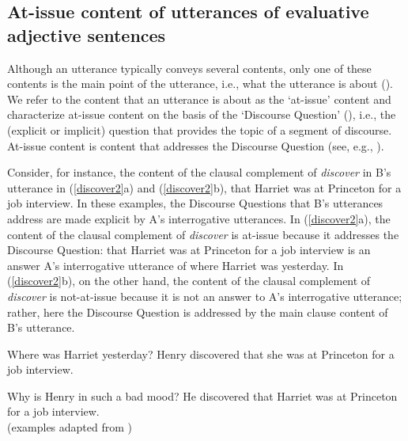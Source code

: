 \documentclass[11pt,fleqn]{article}
\newcommand{\6}{\mbox{$[\hspace*{-.6mm}[$}}
\newcommand{\9}{\mbox{$]\hspace*{-.6mm}]$}}
\begin{document}
\subsection{At-issue content of utterances of evaluative adjective sentences}\label{s32}

Although an utterance typically conveys several contents, only one of these contents is the main point of the utterance, i.e., what the utterance is about (\citealt{potts05}). We refer to the content that an utterance is about as the `at-issue' content and characterize at-issue content on the basis of the `Discourse Question' (\citealt{best-question}), i.e., the (explicit or implicit) question that provides the topic of a segment of discourse. At-issue content is content that addresses the Discourse Question (see, e.g., \citealt{brst-salt10,brst-ar}).

Consider, for instance, the content of the clausal complement of {\em discover} in B's utterance in (\ref{discover2}a) and (\ref{discover2}b), that Harriet was at Princeton for a job interview. In these examples, the Discourse Questions that B's utterances address are made explicit by A's interrogative utterances. In (\ref{discover2}a), the content of the clausal complement of {\em discover} is at-issue because it addresses the Discourse Question: that Harriet was at Princeton for a job interview is an answer A's interrogative utterance of where Harriet was yesterday. In (\ref{discover2}b), on the other hand, the content of the clausal complement of {\em discover} is not-at-issue because it is not an answer to A's interrogative utterance; rather, here the Discourse Question is addressed by the main clause content of B's utterance.


\begin{exe}
\ex\label{discover2}
\begin{xlist}
\ex
\begin{xlist}
 Where was Harriet yesterday?
 Henry discovered that she was at Princeton for a job interview.
\end{xlist}

\ex
\begin{xlist}
 Why is Henry in such a bad mood?
 He discovered that Harriet was at Princeton for a job interview.
\\ \hspace*{.2cm} \hfill (examples adapted from \citealt[1035]{simons07})
\end{xlist}

\end{xlist}
\end{exe}
\end{document}
